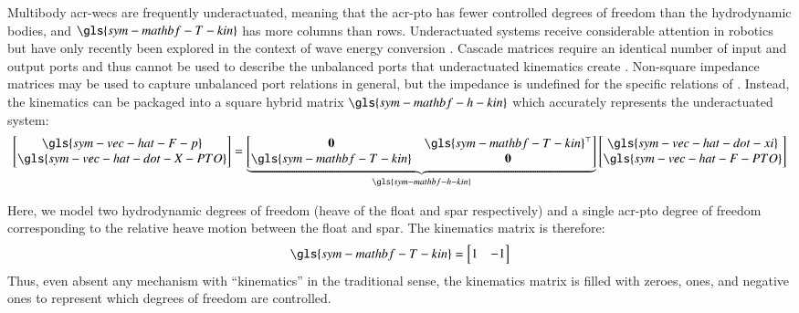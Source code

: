 Multibody \glspl{acr-wec} are frequently underactuated,
meaning that the \gls{acr-pto} has fewer controlled degrees of freedom than the hydrodynamic bodies,
and $\gls{sym-mathbf-T-kin}$ has more columns than rows.
Underactuated systems receive considerable attention in robotics \citep{tedrake_underactuated_2024}
but have only recently been explored in the context of wave energy conversion \citep{faedo_principle_2022}.
Cascade matrices require an identical number of input and output ports
and thus cannot be used to describe the unbalanced ports that underactuated kinematics create
\citep{reveyrand_multiport_2018}.
Non-square impedance matrices may be used to capture unbalanced port relations in general,
but the impedance is undefined for the specific relations of
.
Instead, the kinematics can be packaged into a square hybrid matrix $\gls{sym-mathbf-h-kin}$
which accurately represents the underactuated system:
\begin{equation}\label{eq:h-matrix-kinematics}
    \begin{bmatrix}
        \gls{sym-vec-hat-F-p} \\
        \gls{sym-vec-hat-dot-X-PTO}
    \end{bmatrix}
    = \underbrace{
        \begin{bmatrix}
            \mathbf{0}             & \gls{sym-mathbf-T-kin}^{\top} \\
            \gls{sym-mathbf-T-kin} & \mathbf{0}
        \end{bmatrix}}
        _{\gls{sym-mathbf-h-kin}}
    \begin{bmatrix}
        \gls{sym-vec-hat-dot-xi} \\ \gls{sym-vec-hat-F-PTO}
    \end{bmatrix}
\end{equation}

Here, we model two hydrodynamic degrees of freedom (heave of the float and spar respectively) and a single \gls{acr-pto} degree of freedom corresponding to the relative heave motion between the float and spar.
The kinematics matrix is therefore:
\begin{equation}
    \label{eq:T-kin-specific}
    \gls{sym-mathbf-T-kin} = \begin{bmatrix}1 & -1\end{bmatrix}
\end{equation}
Thus, even absent any mechanism with ``kinematics'' in the traditional sense,
the kinematics matrix is filled with zeroes, ones, and negative ones to represent which degrees of freedom are controlled.


